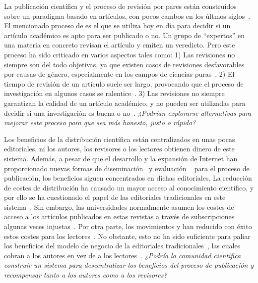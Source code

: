 La publicación científica y el proceso de revisión por pares están construidos
sobre un paradigma basado en artículos, con pocos cambos en los últmos
siglos~\cite{spier2002history}. El mencionado proceso de 
es el que se utiliza hoy en día para decidir si un artículo académico es
apto para ser publicado o no. Un grupo de ``expertos'' en una materia en
concreto revisan el artículo y emiten un veredicto.
Pero este proceso ha sido criticado en varios aspectos tales como: 1) Las revisiones no
siempre son del todo objetivas, ya que existen casos de revisiones desfavorables
por causas de género, especialmente en los campos de ciencias
puras~\cite{wenneras2001nepotism}. 2) El tiempo de revisión de un artículo suele
ser largo, provocando que el proceso de investigación en algunos casos se
ralentice~\cite{huisman2017duration}. 3) Las revisiones no siempre garantizan la
calidad de un artículo académico, y no pueden ser utilizadas para decidir si una
investigación es buena o no~\cite{goldbeck1999evidence}. \emph{¿Podrían
  explorarse alternativas para mejorar este proceso para que sea más honesto,
  justo o rápido?}

Los beneficios de la distribución científica están centralizados en unas pocas
editoriales, ni los autores, los revisores o los lectores obtienen dinero de
este sistema. Además, a pesar de que el desarrollo y la expansión de Internet
han proporcionado nuevas formas de diseminación~\cite{eysenbach2006citation} y
evaluación ~\cite{walker_emerging_2015} para el proceso de publicación, los
beneficios siguen concentrados en dichas editoriales. La reducción de costes de
distribución ha causado un mayor acceso al conocimiento científico, y por ello
se ha cuestionado el papel de las editoriales tradicionales en este
sistema~\cite{ReinventingRigor}. Sin embargo, las universidades normalmente
asumen los costes de acceso a los artículos publicados en estas revistas a
través de subscripciones algunas veces injustas~\cite{bergstrom2004costs}. Por otra parte, los
movimientos  y  han reducido con éxito estos
costes para los lectores~\cite{evans2009open}. No obstante, esto no ha sido
suficiente para paliar los beneficios del modelo de negocio de la editoriales
tradicionales~\cite{lariviere2015oligopoly}, las cuales cobran a los autores en
vez de a los lectores~\cite{van2013true}. \emph{¿Podría la comunidad científica
  construir un sistema para descentralizar los beneficios del proceso de
  publicación y recompensar tanto a los autores como a los revisores?}

